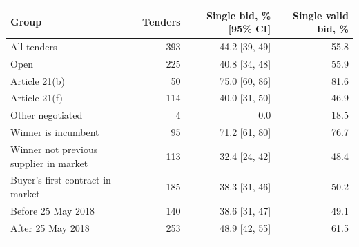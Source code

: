 \begin{tabular}{@{}lrrr@{}}
\toprule
Group & Tenders & Single bid, \% [95\% CI] & Single valid bid, \%\\
\midrule
All tenders & 393 & 44.2 [39, 49] & 55.8\\
Open & 225 & 40.8 [34, 48] & 55.9\\
Article 21(b) & 50 & 75.0 [60, 86] & 81.6\\
Article 21(f) & 114 & 40.0 [31, 50] & 46.9\\
Other negotiated & 4 & 0.0  & 18.5\\
Winner is incumbent & 95 & 71.2 [61, 80] & 76.7\\
Winner not previous supplier in market & 113 & 32.4 [24, 42] & 48.4\\
Buyer's first contract in market & 185 & 38.3 [31, 46] & 50.2\\
Before 25 May 2018 & 140 & 38.6 [31, 47] & 49.1\\
After 25 May 2018 & 253 & 48.9 [42, 55] & 61.5\\
\botrule
\end{tabular}